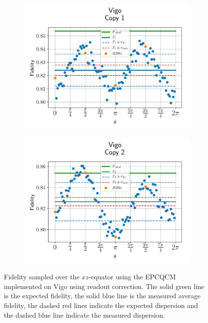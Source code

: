 \begin{figure}[H]
  \centering
  \begin{subfigure}{.5\textwidth}
    \centering
    \includegraphics[width=\textwidth]{Figures/Economical/IBM/OnlyEquator/results_vigo_copy1.png}
    \label{fig:epc_uncorrected_vigo_equator_1}
  \end{subfigure}%
  \begin{subfigure}{.5\textwidth}
    \centering
    \includegraphics[width=\textwidth]{Figures/Economical/IBM/OnlyEquator/results_vigo_copy2.png}
    \label{fig:epc_uncorrected_vigo_equator_2}
  \end{subfigure}
  \vspace{-0.5cm}
  \caption{Fidelity sampled over the $xz$-equator using the EPCQCM implemented on Vigo using readout correction. The solid green line is the expected fidelity, the solid blue line is the measured average fidelity, the dashed red lines indicate the expected dispersion and the dashed blue line indicate the measured dispersion.}
  \label{fig:epc_uncorrected_vigo_equator}
\end{figure}

